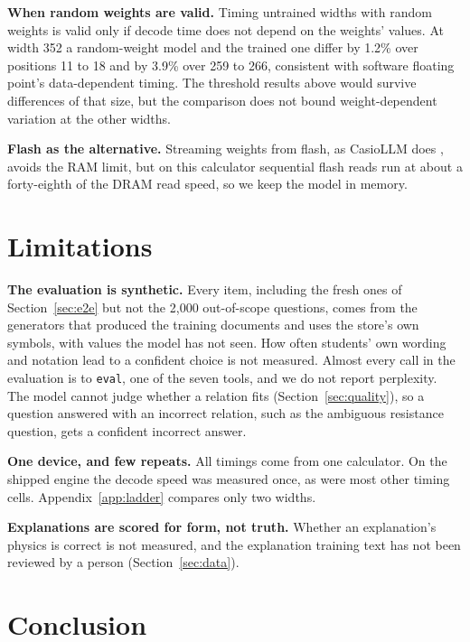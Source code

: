 \documentclass[10pt]{article}
\newcommand{\tok}[1]{\texttt{\small #1}}
\begin{document}
\textbf{When random weights are valid.} Timing untrained widths with random weights is valid only if
decode time does not depend on the weights' values. At width 352 a random-weight model and the
trained one differ by 1.2\% over positions 11 to 18 and by 3.9\% over 259 to 266, consistent with
software floating point's data-dependent timing. The threshold results above would survive
differences of that size, but the comparison does not bound weight-dependent variation at the other
widths.

\textbf{Flash as the alternative.} Streaming weights from flash, as CasioLLM does
\citep{samilososami2026casiollm}, avoids the RAM limit, but on this calculator sequential flash reads
run at about a forty-eighth of the DRAM read speed, so we keep the model in memory.

\section{Limitations}
\label{sec:limits}

 \textbf{The evaluation is synthetic.} Every item, including the fresh ones of Section~\ref{sec:e2e} but not the 2,000
out-of-scope questions, comes from the generators that produced the training documents and uses the store's own
symbols, with values the model has not seen. How often students' own wording and notation lead to a confident
choice is not measured. Almost every call in the evaluation is to \tok{eval}, one of the seven tools, and we do
not report perplexity. The model cannot judge whether a relation fits (Section~\ref{sec:quality}), so a question
answered with an incorrect relation, such as the ambiguous resistance question, gets a confident incorrect answer.

\textbf{One device, and few repeats.} All timings come from one calculator. On the shipped engine the decode speed
was measured once, as were most other timing cells. Appendix~\ref{app:ladder} compares only two widths.

\textbf{Explanations are scored for form, not truth.} Whether an explanation's physics is correct is not measured,
and the explanation training text has not been reviewed by a person (Section~\ref{sec:data}).

\section{Conclusion}
\label{sec:conclusion}
\end{document}
